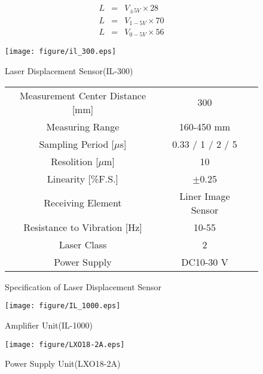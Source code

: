 \documentclass[a4paper,12pt]{article_vdlab_sotsuron}
\begin{document}
\begin{eqnarray}
 \label{eq:v5} L &=& V_{\pm5V} \times 28\\
 \label{eq:v15} L &=& V_{1-5V} \times 70\\
 \label{eq:v05} L &=& V_{0-5V} \times 56
\end{eqnarray}

\vspace*{10mm}
\begin{figure}[htp]
  \begin{minipage}{0.3\textwidth}
    \begin{center}
      \texttt{[image: figure/il\_300.eps]}
      \vspace*{3mm}
      \caption{Laser Displacement Sensor(IL-300)}
      \label{fig:il_300}
    \end{center}
  \end{minipage}
  \begin{minipage}{0.7\textwidth}
      \begin{center}
	\makeatletter
	\def\@captype{table}
	\makeatother
	\caption{Specification of Laser Displacement Sensor}
	\label{tab:il_300}
	\begin{tabular}{ccc}\hline
	  Measurement Center Distance [mm] & 300\\
	  Measuring Range & 160-450 mm\\
	  Sampling Period [$\mu$s]& 0.33 / 1 / 2 / 5\\
	  Resolition [$\mu$m] & 10\\
	  Linearity [\%F.S.] & $\pm$0.25\\
	  Receiving Element & Liner Image Sensor\\
	  Resistance to Vibration [Hz] & 10-55\\
	  Laser Class & 2\\
	  Power Supply & DC10-30 V\\\hline
	  \end{tabular}
	\end{center}
  \end{minipage}
\end{figure}

\vspace*{10mm}
\begin{figure}[htp]
  \begin{minipage}{0.5\textwidth}
    \begin{center}
      \texttt{[image: figure/IL\_1000.eps]}
      \vspace*{3mm}
      \caption{Amplifier Unit(IL-1000)}
      \label{fig:il_1500}
    \end{center}
  \end{minipage}
  \begin{minipage}{0.5\textwidth}
    \begin{center}
      \texttt{[image: figure/LXO18-2A.eps]}
      \vspace*{3mm}
      \caption{Power Supply Unit(LXO18-2A)}
      \label{fig:kz_u3}
    \end{center}
  \end{minipage}
\end{figure}
\end{document}
